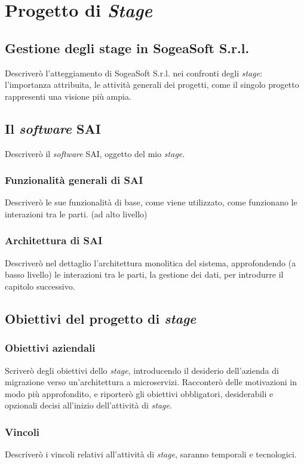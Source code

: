 \chapter{Progetto di \textit{Stage}}
    \section{Gestione degli stage in SogeaSoft S.r.l.}
    Descriverò l'atteggiamento di SogeaSoft S.r.l. nei confronti degli \textit{stage}: l'importanza attribuita, le attività generali dei progetti, come il singolo progetto rappresenti una visione più ampia.
    \section{Il \textit{software} SAI}
    Descriverò il \textit{software} SAI, oggetto del mio \textit{stage}.
        \subsection{Funzionalità generali di SAI}
        Descriverò le sue funzionalità di base, come viene utilizzato, come funzionano le interazioni tra le parti. (ad alto livello)
        \subsection{Architettura di SAI}
        Descriverò nel dettaglio l'architettura monolitica del sistema, approfondendo (a basso livello) le interazioni tra le parti, la gestione dei dati, per introdurre il capitolo successivo.
    \section{Obiettivi del progetto di \textit{stage}}
        \subsection{Obiettivi aziendali}
        Scriverò degli obiettivi dello \textit{stage}, introducendo il desiderio dell'azienda di migrazione verso un'architettura a microservizi. Racconterò delle motivazioni in modo più approfondito, e riporterò gli obiettivi obbligatori, desiderabili e opzionali decisi all'inizio dell'attività di \textit{stage}.
        \subsection{Vincoli}
        Descriverò i vincoli relativi all'attività di \textit{stage}, saranno temporali e tecnologici. 

